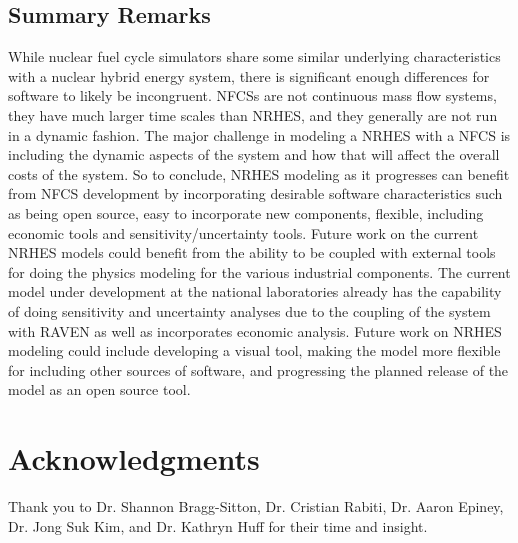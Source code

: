 \documentclass{article}                                                                           %
\begin{document}
\begin{linenumbers}
\section{Summary Remarks}
While nuclear fuel cycle simulators share some similar underlying characteristics with a nuclear hybrid energy system, there is significant enough differences for software to likely be incongruent.  NFCSs are not continuous mass flow systems, they have much larger time scales than NRHES, and they generally are not run in a dynamic fashion. The major challenge in modeling a NRHES with a NFCS is including the dynamic aspects of the system and how that will affect the overall costs of the system. So to conclude, NRHES modeling as it progresses can benefit from NFCS development by incorporating desirable software characteristics such as being open source, easy to incorporate new components, flexible, including economic tools and sensitivity/uncertainty tools. Future work on the current NRHES models could benefit from the ability to be coupled with external tools for doing the physics modeling for the various industrial components. The current model under development at the national laboratories already has the capability of doing sensitivity and uncertainty analyses due to the coupling of the system with RAVEN as well as incorporates economic analysis. Future work on NRHES modeling could include developing a visual tool, making the model more flexible for including other sources of software, and progressing the planned release of the model as an open source tool.


\end{linenumbers}


\pagebreak
\section*{Acknowledgments}

Thank you to Dr. Shannon Bragg-Sitton, Dr. Cristian Rabiti, Dr. Aaron Epiney, Dr. Jong Suk Kim, and Dr. Kathryn Huff for their time and insight.

\pagebreak


\end{document}

